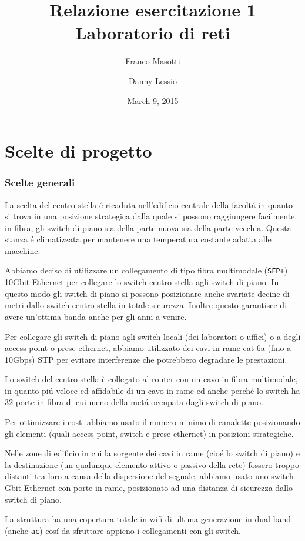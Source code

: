 \documentclass[11pt, a4paper, oneside]{article}
\title{Relazione esercitazione 1 Laboratorio di reti}
\author{Franco Masotti \and Danny Lessio}
\date{March 9, 2015}
\begin{document}
	\maketitle
	\tableofcontents
	\listoffigures
	\listoftables
	\newpage
	\part{Scelte di progetto}
		\section{Scelte generali}
			\par
			La scelta del centro stella \'e ricaduta nell'edificio centrale della facolt\'a in quanto si trova in una posizione strategica dalla quale si possono raggiungere facilmente, in fibra, gli switch di piano sia della parte nuova sia della parte vecchia. Questa stanza \'e climatizzata per mantenere una temperatura costante adatta alle macchine. 
			\par
			Abbiamo deciso di utilizzare un collegamento di tipo fibra multimodale (\texttt{SFP+}) 10Gbit Ethernet per collegare lo switch centro stella agli switch di piano. In questo modo gli switch di piano si possono posizionare anche svariate decine di metri dallo switch centro stella in totale sicurezza. Inoltre questo garantisce di avere un'ottima banda anche per gli anni a venire.
			\par
			Per collegare gli switch di piano agli switch locali (dei laboratori o uffici) o a degli access point o prese ethernet, abbiamo utilizzato dei cavi in rame cat 6a (fino a 10Gbps) STP per evitare interferenze che potrebbero degradare le prestazioni.
			\par
			Lo switch del centro stella è collegato al router con un cavo in fibra multimodale, in quanto pi\'u veloce ed affidabile di un cavo in rame ed anche perch\'e lo switch ha 32 porte in fibra di cui meno della met\'a occupata dagli switch di piano.
			\par
			Per ottimizzare i costi abbiamo usato il numero minimo di canalette posizionando gli elementi (quali access point, switch e prese ethernet) in posizioni strategiche.
			\par
			Nelle zone di edificio in cui la sorgente dei cavi in rame (cio\'e lo switch di piano) e la destinazione (un qualunque elemento attivo o passivo della rete) fossero troppo distanti tra loro a causa della dispersione del segnale, abbiamo usato uno switch Gbit Ethernet con porte in rame, posizionato ad una distanza di sicurezza dallo switch di piano.
			\par
			La struttura ha una copertura totale in wifi di ultima generazione in dual band (anche \texttt{ac}) cos\'i da sfruttare appieno i collegamenti con gli switch.
\end{document}
